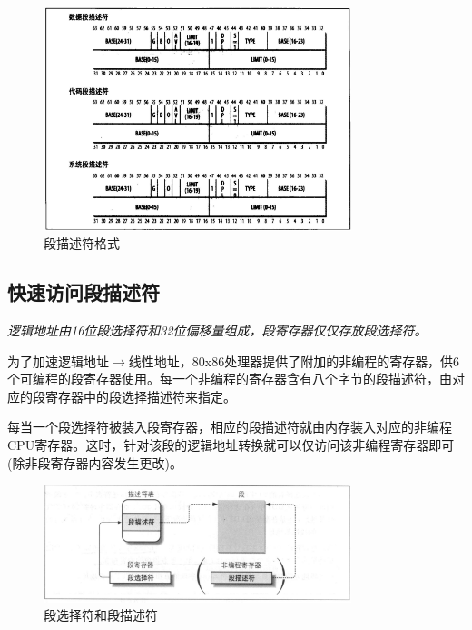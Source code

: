 \begin{figure}[!htbp]
    \centering
    \includegraphics[width=0.8\textwidth]{image/chapter02/段描述符格式.png}
    \caption{段描述符格式}
\end{figure}

\subsection{快速访问段描述符}

    \emph{逻辑地址由16位段选择符和32位偏移量组成，段寄存器仅仅存放段选择符。}

    为了加速逻辑地址$\rightarrow$线性地址，80x86处理器提供了附加的非编程的寄存器，供6个可编程的段寄存器使用。每一个非编程的寄存器含有八个字节的段描述符，由对应的段寄存器中的段选择描述符来指定。

    每当一个段选择符被装入段寄存器，相应的段描述符就由内存装入对应的非编程CPU寄存器。这时，针对该段的逻辑地址转换就可以仅访问该非编程寄存器即可(除非段寄存器内容发生更改)。

\begin{figure}[!htbp]
    \centering
    \includegraphics[width=0.8\textwidth]{image/chapter02/段选择符和段描述符.png}
    \caption{段选择符和段描述符}
\end{figure}


